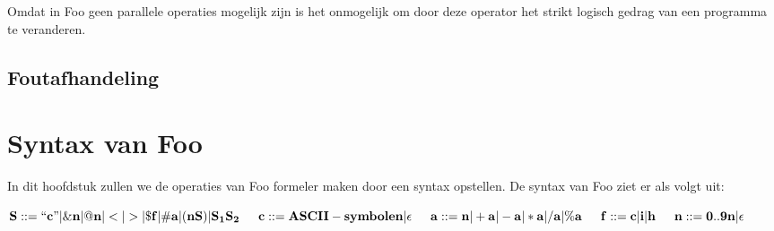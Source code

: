\documentclass[11pt]{article}
\begin{document}
Omdat in Foo geen parallele operaties mogelijk zijn is het onmogelijk om door deze operator het strikt logisch gedrag van een programma te veranderen.

\subsection{Foutafhandeling}

\section{Syntax van Foo}
In dit hoofdstuk zullen we de operaties van Foo formeler maken door een syntax opstellen. 
De syntax van Foo ziet er als volgt uit:
\newline

\begin{math}
{\bf S::= ``c" | \&n | @n | < | > | \$f | \#a | (nS) | S_{1}S_{2} }
\newline
\newline
\indent{\bf c::= ASCII-symbolen| \epsilon}
\newline
\indent{\bf a::= n | +a | -a | *a | /a | \%a}
\newline 
\indent{\bf f::= c | i | h}
\newline
\indent{\bf n::= 0..9n | \epsilon}
\end{math}
\end{document}
